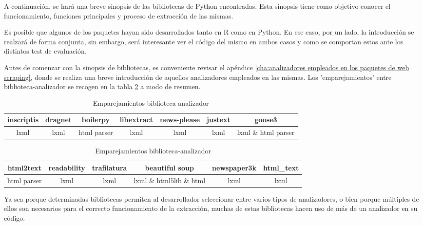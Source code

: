 A continuación, se hará una breve sinopsis de las bibliotecas de Python encontradas. Esta sinopsis tiene 
como objetivo conocer el funcionamiento, funciones principales y proceso de extracción de las mismas.

Es posible que algunos de los paquetes hayan sido desarrollados tanto en R como en Python. En ese caso, por 
un lado, la introducción se realzará de forma conjunta, sin embargo, será interesante ver el código del 
mismo en ambos casos y como se comportan estos ante los distintos test de evaluación.

Antes de comenzar con la sinopsis de bibliotecas, es conveniente revisar el apéndice \ref{cha:analizadores 
empleados en los paquetes de web scraping}, donde se realiza una breve introducción de aquellos analizadores 
empleados en las mismas. Los 'emparejamientos' entre biblioteca-analizador se recogen en la tabla 
\ref{tab:emparejamientos biblioteca-analizador} a modo de resumen.

\begin{table}[h]
  \begin{center}
  \begin{tabular}{| c | c | c | c | c | c | c |} \hline 
    \textbf{inscriptis} & \textbf{dragnet} & \textbf{boilerpy} & \textbf{libextract} & \textbf{news-please} & \textbf{justext} & \textbf{goose3} \\ \hline
    lxml & lxml & html parser & lxml & lxml & lxml & lxml \& html parser \\ \hline
  \end{tabular}

  \hfill \break

  \begin{tabular}{| c | c | c | c | c | c |} \hline 
    \textbf{html2text} & \textbf{readability} & \textbf{trafilatura} & \textbf{beautiful soup} & \textbf{newspaper3k} & \textbf{html\_text}  \\ \hline
    html parser & lxml & lxml & lxml \& html5lib \& html & lxml & lxml \\ \hline
  \end{tabular}

  \caption{Emparejamientos biblioteca-analizador}
  \label{tab:emparejamientos biblioteca-analizador}
  \end{center}
\end{table}

Ya sea porque determinadas bibliotecas permiten al desarrollador seleccionar entre varios tipos de 
analizadores, o bien porque múltiples de ellos son necesarios para el correcto funcionamiento de la 
extracción, muchas de estas bibliotecas hacen uso de más de un analizador en su código.

